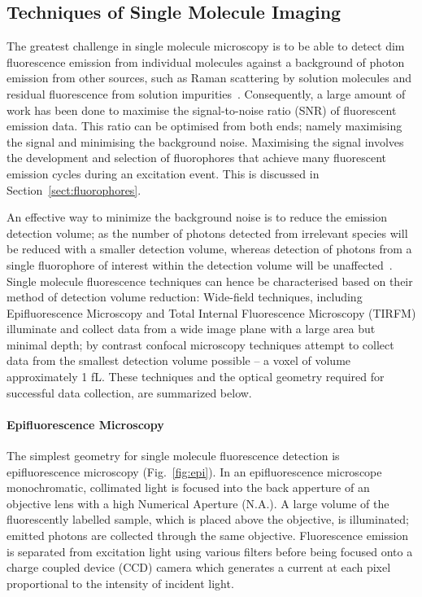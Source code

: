 \subsection{Techniques of Single Molecule Imaging}
The greatest challenge in single molecule microscopy is to be able to detect dim fluorescence emission from individual molecules against a background of photon emission from other sources, such as Raman scattering by solution molecules and residual fluorescence from solution impurities~\cite{Moerner2003}. Consequently, a large amount of work has been done to maximise the signal-to-noise ratio (SNR) of fluorescent emission data. This ratio can be optimised from both ends; namely maximising the signal and minimising the background noise. Maximising the signal involves the development and selection of fluorophores that achieve many fluorescent emission cycles during an excitation event. This is discussed in Section~\ref{sect:fluorophores}. 

An effective way to minimize the background noise is to reduce the emission detection volume; as the number of photons detected from irrelevant species will be reduced with a smaller detection volume, whereas detection of photons from a single fluorophore of interest within the detection volume will be unaffected~\cite{Dillingham2008}. Single molecule fluorescence techniques can hence be characterised based on their method of detection volume reduction: Wide-field techniques, including Epifluorescence Microscopy and Total Internal Fluorescence Microscopy (TIRFM) illuminate and collect data from a wide image plane with a large area but minimal depth; by contrast confocal microscopy techniques attempt to collect data from the smallest detection volume possible -- a voxel of volume approximately 1 fL. These techniques and the optical geometry required for successful data collection, are summarized below. 

\paragraph{Epifluorescence Microscopy}
The simplest geometry for single molecule fluorescence detection is epifluorescence microscopy (Fig.~\ref{fig:epi}). In an epifluorescence microscope monochromatic, collimated light is focused into the back apperture of an objective lens with a high Numerical Aperture (N.A.). A large volume of the fluorescently labelled sample, which is placed above the objective, is illuminated; emitted photons are collected through the same objective. Fluorescence emission is separated from excitation light using various filters before being focused onto a charge coupled device (CCD) camera which generates a current at each pixel proportional to the intensity of incident light.

